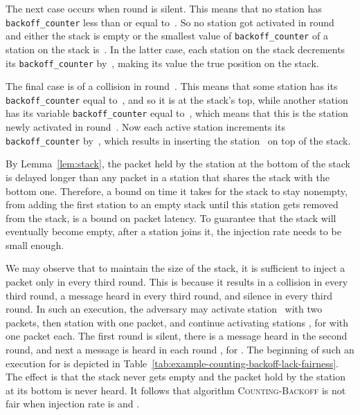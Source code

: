 \documentclass[11pt]{article}
\newcommand{\qed}{\hfill  \smallbreak}
\newenvironment{proof}{\noindent{\bf Proof:}}{\qed}
\begin{document}
\begin{proof}
The next case occurs when round  is silent.
This means that no station has \texttt{backoff\_counter} less than or equal to~.
So no station got activated in round~ and either the stack is empty or the smallest value of  \texttt{backoff\_counter} of a station on the stack is~. 
In the latter case,  each station on the stack decrements its \texttt{backoff\_counter} by~, making its value the true position on the stack.

The final case is of a collision in round~.
This means that some station has its \texttt{backoff\_counter} equal to~, and so it is at the stack's top, while another station has its variable \texttt{backoff\_counter} equal to~, which means that this is the station newly activated in round~.
Now each active station increments its \texttt{backoff\_counter} by~, which results in inserting the station~ on top of the stack.
\end{proof} 

By Lemma~\ref{lem:stack}, the packet held by the station at the bottom of the stack is delayed longer than any packet in a station that shares the stack with the bottom one.
Therefore, a bound on time it takes for the stack to stay nonempty, from adding the first station to an empty stack until this station gets removed from the stack, is a bound on packet latency.
To guarantee that the stack will eventually become empty, after a station joins it, the injection rate needs to be small enough.

We may observe that to maintain the size of the stack, it is sufficient to inject a packet only in every third round.
This is because it results in a collision in every third round, a message heard in every third round, and silence in every third round.
In such an execution, the adversary may activate station~ with two packets, then station  with one packet, and continue activating stations , for  with one packet each.
The first round is silent, there is a message heard in the second round, and next a message is heard in each round  , for .
The beginning of such an execution for  is depicted in Table~\ref{tab:example-counting-backoff-lack-fairness}.
The effect is that the stack never gets empty and the packet hold by the station at its bottom is never heard. 
It follows that algorithm \textsc{Counting-Backoff} is not fair when injection rate is  and .
\end{document}
